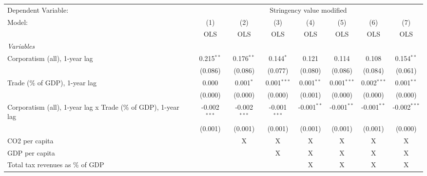 
\begingroup
\centering
\begin{tabular}{lccccccc}
   \toprule
   Dependent Variable: & \multicolumn{7}{c}{Stringency value modified}\\
   Model:                                                         & (1)            & (2)            & (3)            & (4)           & (5)           & (6)           & (7)\\  
                                                                  &  OLS           & OLS            & OLS            & OLS           & OLS           & OLS           & OLS\\  
   \midrule
   \emph{Variables}\\
   Corporatism (all), 1-year lag                                  & 0.215$^{**}$   & 0.176$^{**}$   & 0.144$^{*}$    & 0.121         & 0.114         & 0.108         & 0.154$^{**}$\\   
                                                                  & (0.086)        & (0.086)        & (0.077)        & (0.080)       & (0.086)       & (0.084)       & (0.061)\\   
   Trade (\% of GDP), 1-year lag                                  & 0.000          & 0.001$^{*}$    & 0.001$^{***}$  & 0.001$^{**}$  & 0.001$^{***}$ & 0.002$^{***}$ & 0.001$^{**}$\\   
                                                                  & (0.000)        & (0.000)        & (0.000)        & (0.001)       & (0.000)       & (0.000)       & (0.000)\\   
   Corporatism (all), 1-year lag x Trade (\% of GDP), 1-year lag  & -0.002$^{***}$ & -0.002$^{***}$ & -0.001$^{***}$ & -0.001$^{**}$ & -0.001$^{**}$ & -0.001$^{**}$ & -0.002$^{***}$\\   
                                                                  & (0.001)        & (0.001)        & (0.001)        & (0.001)       & (0.001)       & (0.001)       & (0.000)\\   
   CO2 per capita                                                 &                & X              & X              & X             & X             & X             & X\\  
   GDP per capita                                                 &                &                & X              & X             & X             & X             & X\\  
   Total tax revenues as \% of GDP                                &                &                &                & X             & X             & X             & X\\  

\end{tabular}
